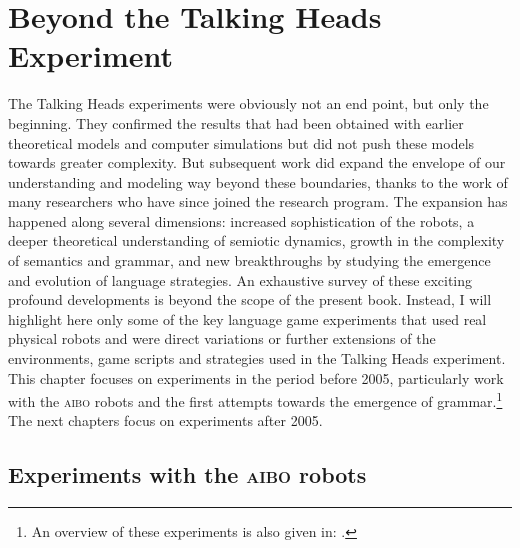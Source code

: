 \chapter{Beyond the Talking Heads Experiment}
\label{c:postscriptum}
\setcounter{foot}{1}

The Talking Heads experiments were obviously not an end point, but only the beginning. They confirmed the results that 
had been obtained with earlier theoretical models and computer simulations but did not push these models 
towards greater complexity. But subsequent work did expand the envelope of our understanding and modeling way  
beyond these boundaries, thanks to the work of many researchers who have since joined the research program. 
The expansion has happened along several dimensions: increased sophistication of the robots, a deeper theoretical 
understanding of semiotic dynamics, growth in the complexity of semantics and grammar, and new breakthroughs by 
studying the emergence and evolution of language strategies. An exhaustive survey of these exciting profound developments 
is beyond the scope of the present book. Instead, I will highlight here only some of the key language game experiments that 
used real physical robots and were direct variations or further extensions of the environments, game scripts
and strategies used in the Talking Heads experiment. This chapter focuses on experiments 
in the period before 2005, particularly work with the \textsc{aibo} robots and the first attempts towards the emergence 
of grammar.\footnote{An overview of these experiments is also given in: \cite{Steels:2005}.}
The next chapters focus on experiments after 2005. 

\section{Experiments with the \textsc{aibo} robots} 

